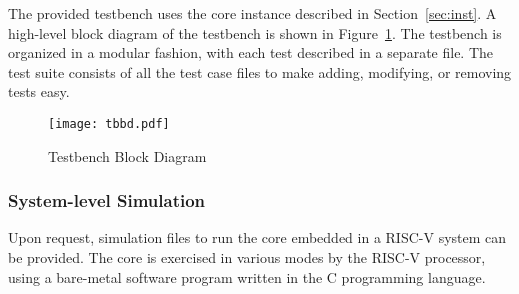 The provided testbench uses the core instance described in
Section~\ref{sec:inst}. A high-level block diagram of the testbench is shown in
Figure~\ref{fig:tbbd}. The testbench is organized in a modular fashion, with
each test described in a separate file. The test suite consists of all the test
case files to make adding, modifying, or removing tests easy.

\begin{figure}[!htbp]
    \centerline{\texttt{[image: tbbd.pdf]}}
    \vspace{0cm}\caption{Testbench Block Diagram}
    \label{fig:tbbd}
\end{figure}



\subsubsection*{System-level Simulation}

Upon request, simulation files to run the core embedded in a RISC-V system can
be provided. The core is exercised in various modes by the RISC-V processor,
using a bare-metal software program written in the C programming language.
